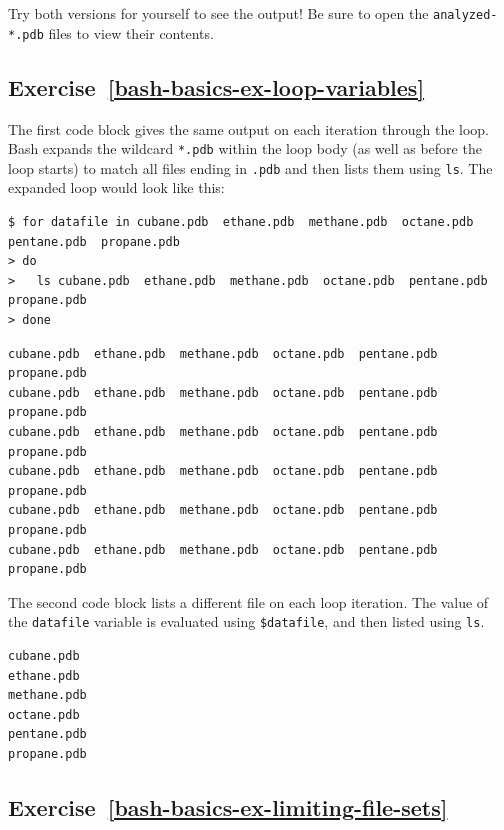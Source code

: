 \documentclass[
]{krantz}
\begin{document}
Try both versions for yourself to see the output! Be sure to open the
\texttt{analyzed-*.pdb} files to view their contents.

\hypertarget{exercise-refbash-basics-ex-loop-variables}{%
\subsection*{Exercise~\ref{bash-basics-ex-loop-variables}}\label{exercise-refbash-basics-ex-loop-variables}}


The first code block gives the same output on each iteration through
the loop.
Bash expands the wildcard \texttt{*.pdb} within the loop body (as well as
before the loop starts) to match all files ending in \texttt{.pdb}
and then lists them using \texttt{ls}.
The expanded loop would look like this:

\begin{verbatim}
$ for datafile in cubane.pdb  ethane.pdb  methane.pdb  octane.pdb  pentane.pdb  propane.pdb
> do
>   ls cubane.pdb  ethane.pdb  methane.pdb  octane.pdb  pentane.pdb  propane.pdb
> done
\end{verbatim}

\begin{verbatim}
cubane.pdb  ethane.pdb  methane.pdb  octane.pdb  pentane.pdb  propane.pdb
cubane.pdb  ethane.pdb  methane.pdb  octane.pdb  pentane.pdb  propane.pdb
cubane.pdb  ethane.pdb  methane.pdb  octane.pdb  pentane.pdb  propane.pdb
cubane.pdb  ethane.pdb  methane.pdb  octane.pdb  pentane.pdb  propane.pdb
cubane.pdb  ethane.pdb  methane.pdb  octane.pdb  pentane.pdb  propane.pdb
cubane.pdb  ethane.pdb  methane.pdb  octane.pdb  pentane.pdb  propane.pdb
\end{verbatim}

The second code block lists a different file on each loop iteration.
The value of the \texttt{datafile} variable is evaluated using \texttt{\$datafile},
and then listed using \texttt{ls}.

\begin{verbatim}
cubane.pdb
ethane.pdb
methane.pdb
octane.pdb
pentane.pdb
propane.pdb
\end{verbatim}

\hypertarget{exercise-refbash-basics-ex-limiting-file-sets}{%
\subsection*{Exercise~\ref{bash-basics-ex-limiting-file-sets}}\label{exercise-refbash-basics-ex-limiting-file-sets}}
\end{document}
